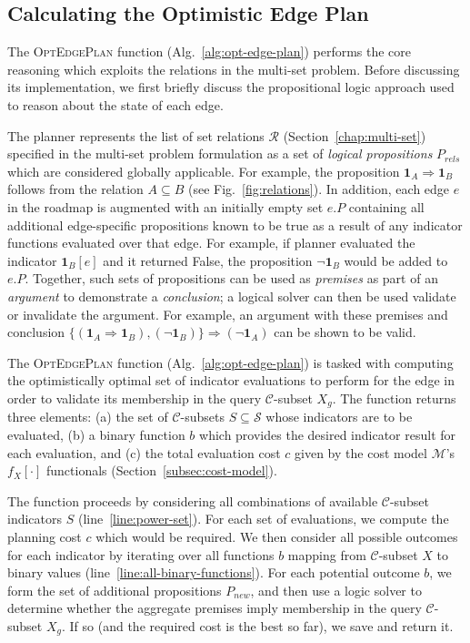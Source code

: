 \subsection{Calculating the Optimistic Edge Plan}
\label{subsec:alg-opt-edge-plan}

The \textsc{OptEdgePlan} function (Alg.~\ref{alg:opt-edge-plan})
performs the core reasoning which exploits the relations in
the multi-set problem.
Before discussing its implementation,
we first briefly discuss the propositional logic approach
used to reason about the state of each edge.

The planner represents the list of set relations $\mathcal{R}$
(Section~\ref{chap:multi-set})
specified in the multi-set problem formulation
as a set of \emph{logical propositions} $P_{rels}$
which are considered globally applicable.
For example,
the proposition $\mathbf{1}_A \Rightarrow \mathbf{1}_B$
follows from the relation $A \subseteq B$
(see Fig.~\ref{fig:relations}).
In addition,
each edge $e$ in the roadmap is augmented with an initially empty
set $e.P$ containing all additional edge-specific propositions
known to be true as a result of any indicator functions evaluated
over that edge.
For example,
if planner evaluated the indicator $\mathbf{1}_B[e]$
and it returned False,
the proposition $\lnot\mathbf{1}_B$ would be added to $e.P$.
Together, such sets of propositions can be used as \emph{premises}
as part of an \emph{argument} to demonstrate a \emph{conclusion};
a logical solver can then be used validate or invalidate the argument.
For example, an argument with these premises and conclusion
$\{ (\mathbf{1}_A \Rightarrow \mathbf{1}_B), (\lnot\mathbf{1}_B) \}
\Rightarrow (\lnot\mathbf{1}_A)$
can be shown to be valid.

The \textsc{OptEdgePlan} function (Alg.~\ref{alg:opt-edge-plan})
is tasked with computing
the optimistically optimal set of indicator evaluations to perform
for the edge in order to validate its membership in the query
$\mathcal{C}$-subset $X_g$.
The function returns three elements:
(a) the set of $\mathcal{C}$-subsets $S \subseteq \mathcal{S}$
whose indicators are to be evaluated,
(b) a binary function $b$
which provides the desired indicator result for each evaluation,
and (c) the total evaluation cost $c$
given by the cost model $\mathcal{M}$'s $f_X[\cdot]$ functionals
(Section~\ref{subsec:cost-model}).

The function proceeds by considering all combinations of
available $\mathcal{C}$-subset indicators $S$ (line~\ref{line:power-set}).
For each set of evaluations,
we compute the planning cost $c$ which would be required.
We then consider all possible outcomes for each indicator
by iterating over all functions $b$ mapping
from $\mathcal{C}$-subset $X$ to binary values
(line~\ref{line:all-binary-functions}).
For each potential outcome $b$,
we form the set of additional propositions $P_{new}$,
and then use a logic solver to determine whether the aggregate
premises imply membership in the query $\mathcal{C}$-subset $X_g$.
If so (and the required cost is the best so far),
we save and return it.

